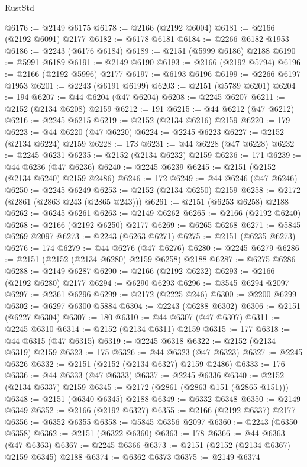 \begin{lexlean}{RustStd}
\begin{coremodule}
@6176 := @2149 @6175
@6178 := @2166 (@2192 @6004)
@6181 := @2166 (@2192 @6091) @2177
@6182 := @6178 @6181
@6184 := @2266 @6182 @1953
@6186 := @2243 (@6176 @6184)
@6189 := @2151 (@5999 @6186) @2188
@6190 := @5991 @6189
@6191 := @2149 @6190
@6193 := @2166 (@2192 @5794)
@6196 := @2166 (@2192 @5996) @2177
@6197 := @6193 @6196
@6199 := @2266 @6197 @1953
@6201 := @2243 (@6191 @6199)
@6203 := @2151 (@5789 @6201)
@6204 := 194
@6207 := @44 @6204 (@47 @6204)
@6208 := @2245 @6207
@6211 := @2152 (@2134 @6208) @2159
@6212 := 191
@6215 := @44 @6212 (@47 @6212)
@6216 := @2245 @6215
@6219 := @2152 (@2134 @6216) @2159
@6220 := 179
@6223 := @44 @6220 (@47 @6220)
@6224 := @2245 @6223
@6227 := @2152 (@2134 @6224) @2159
@6228 := 173
@6231 := @44 @6228 (@47 @6228)
@6232 := @2245 @6231
@6235 := @2152 (@2134 @6232) @2159
@6236 := 171
@6239 := @44 @6236 (@47 @6236)
@6240 := @2245 @6239
@6245 := @2151 (@2152 (@2134 @6240) @2159 @2486)
@6246 := 172
@6249 := @44 @6246 (@47 @6246)
@6250 := @2245 @6249
@6253 := @2152 (@2134 @6250) @2159
@6258 := @2172 (@2861 (@2863 @243 (@2865 @243)))
@6261 := @2151 (@6253 @6258) @2188
@6262 := @6245 @6261
@6263 := @2149 @6262
@6265 := @2166 (@2192 @6240)
@6268 := @2166 (@2192 @6250) @2177
@6269 := @6265 @6268
@6271 := @5845 @6269 @2097
@6273 := @2243 (@6263 @6271)
@6275 := @2151 (@6235 @6273)
@6276 := 174
@6279 := @44 @6276 (@47 @6276)
@6280 := @2245 @6279
@6286 := @2151 (@2152 (@2134 @6280) @2159 @6258) @2188
@6287 := @6275 @6286
@6288 := @2149 @6287
@6290 := @2166 (@2192 @6232)
@6293 := @2166 (@2192 @6280) @2177
@6294 := @6290 @6293
@6296 := @3545 @6294 @2097
@6297 := @2361 @6296
@6299 := @2172 (@2225 @246)
@6300 := @2200 @6299
@6302 := @6297 @6300 @5884
@6304 := @2243 (@6288 @6302)
@6306 := @2151 (@6227 @6304)
@6307 := 180
@6310 := @44 @6307 (@47 @6307)
@6311 := @2245 @6310
@6314 := @2152 (@2134 @6311) @2159
@6315 := 177
@6318 := @44 @6315 (@47 @6315)
@6319 := @2245 @6318
@6322 := @2152 (@2134 @6319) @2159
@6323 := 175
@6326 := @44 @6323 (@47 @6323)
@6327 := @2245 @6326
@6332 := @2151 (@2152 (@2134 @6327) @2159 @2486)
@6333 := 176
@6336 := @44 @6333 (@47 @6333)
@6337 := @2245 @6336
@6340 := @2152 (@2134 @6337) @2159
@6345 := @2172 (@2861 (@2863 @151 (@2865 @151)))
@6348 := @2151 (@6340 @6345) @2188
@6349 := @6332 @6348
@6350 := @2149 @6349
@6352 := @2166 (@2192 @6327)
@6355 := @2166 (@2192 @6337) @2177
@6356 := @6352 @6355
@6358 := @5845 @6356 @2097
@6360 := @2243 (@6350 @6358)
@6362 := @2151 (@6322 @6360)
@6363 := 178
@6366 := @44 @6363 (@47 @6363)
@6367 := @2245 @6366
@6373 := @2151 (@2152 (@2134 @6367) @2159 @6345) @2188
@6374 := @6362 @6373
@6375 := @2149 @6374

\end{coremodule}
\end{lexlean}
